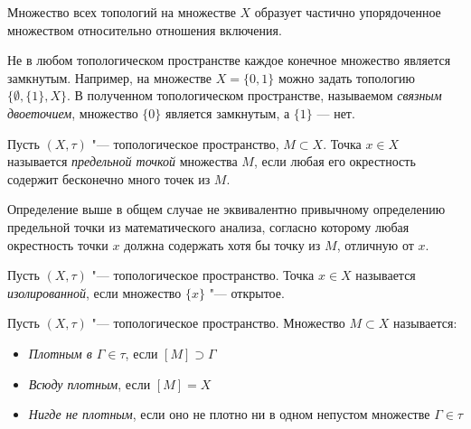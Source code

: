 \begin{note}
	Множество всех топологий на множестве $X$ образует частично упорядоченное множеством относительно отношения включения.
\end{note}

\begin{note}
	Не в любом топологическом пространстве каждое конечное множество является замкнутым. Например, на множестве $X = \{ 0, 1\}$ можно задать топологию $\{\emptyset, \{1\}, X\}$. В полученном топологическом пространстве, называемом \emph{связным двоеточием}, множество $\{0\}$ является замкнутым, а $\{1\}$ --- нет.
\end{note}

\begin{definition}
	Пусть $(X, \tau)$ "--- топологическое пространство, $M \subset X$. Точка ${x \in X}$ называется \textit{предельной точкой} множества $M$, если любая его окрестность содержит бесконечно много точек из $M$.
\end{definition}

\begin{note}
	Определение выше в общем случае не эквивалентно привычному определению предельной точки из математического анализа, согласно которому любая окрестность точки $x$ должна содержать хотя бы точку из $M$, отличную от $x$.
\end{note}

\begin{definition}
	Пусть $(X, \tau)$ "--- топологическое пространство. Точка $x \in X$ называется \textit{изолированной}, если множество $\{x\}$ "--- открытое.
\end{definition}

\begin{definition}
	Пусть $(X, \tau)$ "--- топологическое пространство. Множество $M \subset X$ называется:
	\begin{itemize}
		\item \textit{Плотным в $\Gamma \in \tau$}, если $[M] \supset \Gamma$
		\item \textit{Всюду плотным}, если $[M] = X$
		\item \textit{Нигде не плотным}, если оно не плотно ни в одном непустом множестве $\Gamma \in \tau$
	\end{itemize}
\end{definition}

